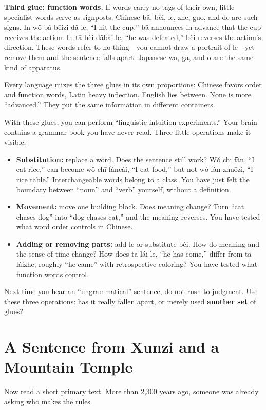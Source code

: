 \textbf{Third glue: function words.} If words carry no tags of their own, little specialist words serve as signposts. Chinese bǎ, bèi, le, zhe, guo, and de are such signs. In wǒ bǎ bēizi dǎ le, ``I hit the cup,'' bǎ announces in advance that the cup receives the action. In tā bèi dǎbài le, ``he was defeated,'' bèi reverses the action's direction. These words refer to no thing---you cannot draw a portrait of le---yet remove them and the sentence falls apart. Japanese wa, ga, and o are the same kind of apparatus.

Every language mixes the three glues in its own proportions: Chinese favors order and function words, Latin heavy inflection, English lies between. None is more ``advanced.'' They put the same information in different containers.

With these glues, you can perform ``linguistic intuition experiments.'' Your brain contains a grammar book you have never read. Three little operations make it visible:

\begin{itemize}
\item \textbf{Substitution:} replace a word. Does the sentence still work? Wǒ chī fàn, ``I eat rice,'' can become wǒ chī fàncài, ``I eat food,'' but not wǒ fàn zhuōzi, ``I rice table.'' Interchangeable words belong to a class. You have just felt the boundary between ``noun'' and ``verb'' yourself, without a definition.
\item \textbf{Movement:} move one building block. Does meaning change? Turn ``cat chases dog'' into ``dog chases cat,'' and the meaning reverses. You have tested what word order controls in Chinese.
\item \textbf{Adding or removing parts:} add le or substitute bèi. How do meaning and the sense of time change? How does tā lái le, ``he has come,'' differ from tā láizhe, roughly ``he came'' with retrospective coloring? You have tested what function words control.
\end{itemize}
Next time you hear an ``ungrammatical'' sentence, do not rush to judgment. Use these three operations: has it really fallen apart, or merely used \textbf{another set} of glues?

\section{A Sentence from Xunzi and a Mountain Temple}
Now read a short primary text. More than 2,300 years ago, someone was already asking who makes the rules.

